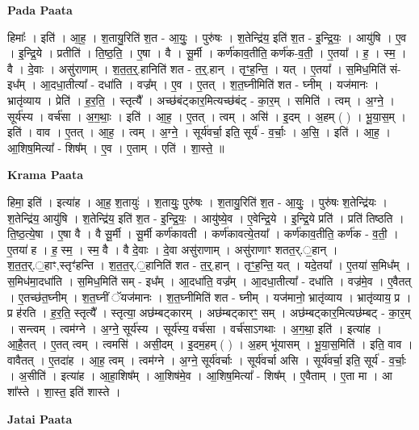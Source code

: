 \documentclass[17pt]{extarticle}
\begin{document}
\textbf{Pada Paata} \newline

हिमाः᳚ । इति॑ । आ॒ह॒ । श॒तायु॒रिति॑ श॒त - आ॒युः॒ । पुरु॑षः । श॒तेन्द्रि॑य॒ इति॑ श॒त - इ॒न्द्रि॒यः॒ । आयु॑षि । ए॒व । इ॒न्द्रि॒ये । प्रतीति॑ । ति॒ष्ठ॒ति॒ । ए॒षा । वै । सू॒र्मी । कर्ण॑काव॒तीति॒ कर्ण॑क-व॒ती॒ । ए॒तया᳚ । ह॒ । स्म॒ । वै । दे॒वाः । असु॑राणाम् । श॒त॒त॒र्॒.हानिति॑ शत - त॒र्॒.हान् । तृꣳ॒॒ह॒न्ति॒ । यत् । ए॒तया᳚ । स॒मिध॒मिति॑ सं-इध᳚म् । आ॒दधा॒तीत्या᳚ - दधा॑ति । वज्र᳚म् । ए॒व । ए॒तत् । श॒त॒घ्नीमिति॑ शत - घ्नीम् । यज॑मानः । भ्रातृ॑व्याय । प्रेति॑ । ह॒र॒ति॒ । स्तृत्यै᳚ । अच्छ॑बंट्कार॒मित्यच्छ॑बंट् - का॒र॒म् । समिति॑ । त्वम् । अ॒ग्ने॒ । सूर्य॑स्य । वर्च॑सा । अ॒ग॒थाः॒ । इति॑ । आ॒ह॒ । ए॒तत् । त्वम् । असि॑ । इ॒दम् । अ॒हम् ( ) । भू॒या॒स॒म् । इति॑ । वाव । ए॒तत् । आ॒ह॒ । त्वम् । अ॒ग्ने॒ । सूर्य॑वर्चा॒ इति॒ सूर्य॑ - व॒र्चाः॒ । अ॒सि॒ । इति॑ । आ॒ह॒ । आ॒शिष॒मित्या᳚ - शिष᳚म् । ए॒व । ए॒ताम् । एति॑ । शा॒स्ते॒ ॥  \newline


\textbf{Krama Paata} \newline

हिमा॒ इति॑ । इत्या॑ह । आ॒ह॒ श॒तायुः॑ । श॒तायुः॒ पुरु॑षः । श॒तायु॒रिति॑ श॒त - आ॒युः॒ । पुरु॑षः श॒तेन्द्रि॑यः । श॒तेन्द्रि॑य॒ आयु॑षि । श॒तेन्द्रि॑य॒ इति॑ श॒त - इ॒न्द्रि॒यः॒ । आयु॑ष्ये॒व । ए॒वेन्द्रि॒ये । इ॒न्द्रि॒ये प्रति॑ । प्रति॑ तिष्ठति । ति॒ष्ठ॒त्ये॒षा । ए॒षा वै । वै सू॒र्मी । सू॒र्मी कर्ण॑कावती । कर्ण॑कावत्ये॒तया᳚ । कर्ण॑काव॒तीति॒ कर्ण॑क - व॒ती॒ । ए॒तया॑ ह । ह॒ स्म॒ । स्म॒ वै । वै दे॒वाः । दे॒वा असु॑राणाम् । असु॑राणाꣳ शतत॒र्.॒हान् । श॒त॒त॒र्.॒हाꣳ,स्तृꣳ॑हन्ति । श॒त॒त॒र्.॒हानिति॑ शत - त॒र्॒.हान् । तृꣳ॒॒ह॒न्ति॒ यत् । यदे॒तया᳚ । ए॒तया॑ स॒मिध᳚म् । स॒मिध॑मा॒दधा॑ति । स॒मिध॒मिति॑ सम् - इध᳚म् । आ॒दधा॑ति॒ वज्र᳚म् । आ॒दधा॒तीत्या᳚ - दधा॑ति । वज्र॑मे॒व । ए॒वैतत् । ए॒तच्छ॑त॒घ्नीम् । श॒त॒घ्नीं ॅयज॑मानः । श॒त॒घ्नीमिति॑ शत - घ्नीम् । यज॑मानो॒ भ्रातृ॑व्याय । भ्रातृ॑व्याय॒ प्र । प्र ह॑रति । ह॒र॒ति॒ स्तृत्यै᳚ । स्तृत्या॒ अछ॑म्बट्कारम् । अछ॑म्बट्कारꣳ॒॒ सम् । अछ॑म्बट्कार॒मित्यछ॑म्बट् - का॒र॒म् । सन्त्वम् । त्वम॑ग्ने । अ॒ग्ने॒ सूर्य॑स्य । सूर्य॑स्य॒ वर्च॑सा । वर्च॑साऽगथाः । अ॒ग॒था॒ इति॑ । इत्या॑ह । आ॒है॒तत् । ए॒तत् त्वम् । त्वमसि॑ । असी॒दम् । इ॒दम॒हम् ( ) । अ॒हम् भू॑यासम् । भू॒या॒स॒मिति॑ । इति॒ वाव । वावैतत् । ए॒तदा॑ह । आ॒ह॒ त्वम् । त्वम॑ग्ने । अ॒ग्ने॒ सूर्य॑वर्चाः । सूर्य॑वर्चा असि । सूर्य॑वर्चा॒ इति॒ सूर्य॑ - व॒र्चाः॒ । अ॒सीति॑ । इत्या॑ह । आ॒हा॒शिष᳚म् । आ॒शिष॑मे॒व । आ॒शिष॒मित्या᳚ - शिष᳚म् । ए॒वैताम् । ए॒ता मा । आ शा᳚स्ते । शा॒स्त॒ इति॑ शास्ते । \newline

\textbf{Jatai Paata} \newline
\end{document}
